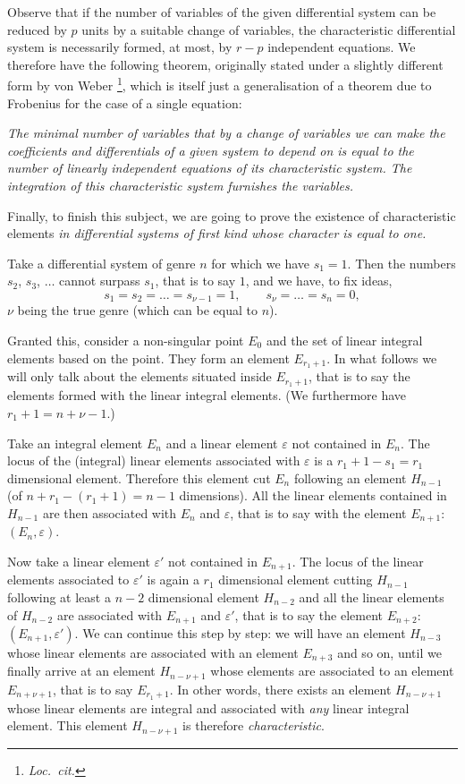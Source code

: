 \documentclass[leqno,11pt]{book}
\makeatletter
\theoremstyle{shape1}
\theoremstyle{shapesmall}
\let\old@epsilon\epsilon
\let\old@varepsilon\varepsilon
\let\epsilon\old@varepsilon
\let\varepsilon\old@epsilon
\newcommand{\somespace}{\vspace{9pt}}
\makeatother
\begin{document}
Observe that if the number of variables of the given differential system can be reduced by $p$ units by a suitable change of variables, the characteristic differential system is necessarily formed, at most, by $r-p$ independent equations. We therefore have the following theorem, originally stated under a slightly different form by von Weber \footnote{\emph{Loc.~cit.}}, which is itself just a generalisation of a theorem due to Frobenius for the case of a single equation:

\somespace

\emph{The minimal number of variables that by a change of variables we can make the coefficients and differentials of a given system to depend on is equal to the number of linearly independent equations of its characteristic system. The integration of this characteristic system furnishes the variables.}

\somespace

Finally, to finish this subject, we are going to prove the existence of characteristic elements \emph{in differential systems of first kind whose character is equal to one.}

Take a differential system of genre $n$ for which we have $s_{1}=1$. Then the numbers $s_{2}$, $s_{3}$, $\dots$ cannot surpass $s_{1}$, that is to say $1$, and we have, to fix ideas,
\[
s_{1}=s_{2}=\dots=s_{\nu-1}=1,\qquad s_{\nu}=\dots=s_{n}=0,
\]
$\nu$ being the true genre (which can be equal to $n$).

Granted this, consider a non-singular point $E_{0}$ and the set of linear integral elements based on the point. They form an element $E_{r_{1}+1}$. In what follows we will only talk about the elements situated inside $E_{r_{1}+1}$, that is to say the elements formed with the linear integral elements. (We furthermore have $r_{1}+1=n+\nu-1$.)

Take an integral element $E_{n}$ and a linear element $\epsilon$ not contained in $E_{n}$. The locus of the (integral) linear elements associated with $\epsilon$ is a $r_{1}+1-s_{1}=r_{1}$ dimensional element. Therefore this element cut $E_{n}$ following an element $H_{n-1}$ (of $n+r_{1}-(r_{1}+1)=n-1$ dimensions). All the linear elements contained in $H_{n-1}$ are then associated with $E_{n}$ and $\epsilon$, that is to say with the element $E_{n+1}$: $(E_{n},\epsilon)$.

Now take a linear element $\epsilon'$ not contained in $E_{n+1}$. The locus of the linear elements associated to $\epsilon'$ is again a $r_{1}$ dimensional element cutting $H_{n-1}$ following at least a $n-2$ dimensional element $H_{n-2}$ and all the linear elements of $H_{n-2}$ are associated with $E_{n+1}$ and $\epsilon'$, that is to say the element $E_{n+2}$: $(E_{n+1},\epsilon')$. We can continue this step by step: we will have an element $H_{n-3}$ whose linear elements are associated with an element $E_{n+3}$ and so on, until we finally arrive at an element $H_{n-\nu+1}$ whose elements are associated to an element $E_{n+\nu+1}$, that is to say $E_{r_{1}+1}$. In other words, there exists an element  $H_{n-\nu+1}$ whose linear elements are integral and associated with \emph{any} linear integral element. This element $H_{n-\nu+1}$ is therefore \emph{characteristic}.
\end{document}
